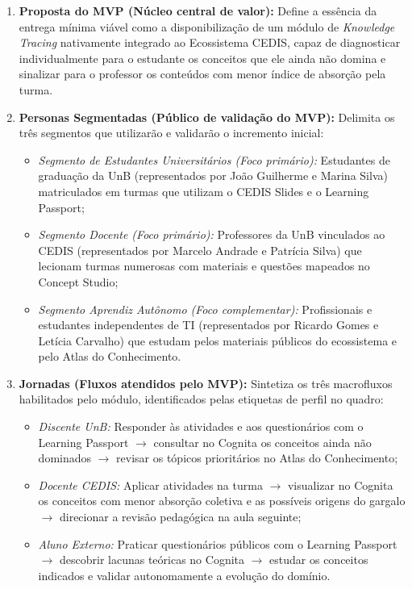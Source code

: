 \begin{enumerate}
    \item \textbf{Proposta do MVP (Núcleo central de valor):} Define a essência da entrega mínima viável como a disponibilização de um módulo de \textit{Knowledge Tracing} nativamente integrado ao Ecossistema CEDIS, capaz de diagnosticar individualmente para o estudante os conceitos que ele ainda não domina e sinalizar para o professor os conteúdos com menor índice de absorção pela turma.

    \item \textbf{Personas Segmentadas (Público de validação do MVP):} Delimita os três segmentos que utilizarão e validarão o incremento inicial:
    \begin{itemize}
        \item \textit{Segmento de Estudantes Universitários (Foco primário):} Estudantes de graduação da UnB (representados por João Guilherme e Marina Silva) matriculados em turmas que utilizam o CEDIS Slides e o Learning Passport;
        \item \textit{Segmento Docente (Foco primário):} Professores da UnB vinculados ao CEDIS (representados por Marcelo Andrade e Patrícia Silva) que lecionam turmas numerosas com materiais e questões mapeados no Concept Studio;
        \item \textit{Segmento Aprendiz Autônomo (Foco complementar):} Profissionais e estudantes independentes de TI (representados por Ricardo Gomes e Letícia Carvalho) que estudam pelos materiais públicos do ecossistema e pelo Atlas do Conhecimento.
    \end{itemize}

    \item \textbf{Jornadas (Fluxos atendidos pelo MVP):} Sintetiza os três macrofluxos habilitados pelo módulo, identificados pelas etiquetas de perfil no quadro:
    \begin{itemize}
        \item \textit{Discente UnB:} Responder às atividades e aos questionários com o Learning Passport $\rightarrow$ consultar no Cognita os conceitos ainda não dominados $\rightarrow$ revisar os tópicos prioritários no Atlas do Conhecimento;
        \item \textit{Docente CEDIS:} Aplicar atividades na turma $\rightarrow$ visualizar no Cognita os conceitos com menor absorção coletiva e as possíveis origens do gargalo $\rightarrow$ direcionar a revisão pedagógica na aula seguinte;
        \item \textit{Aluno Externo:} Praticar questionários públicos com o Learning Passport $\rightarrow$ descobrir lacunas teóricas no Cognita $\rightarrow$ estudar os conceitos indicados e validar autonomamente a evolução do domínio.
    \end{itemize}


\end{enumerate}
